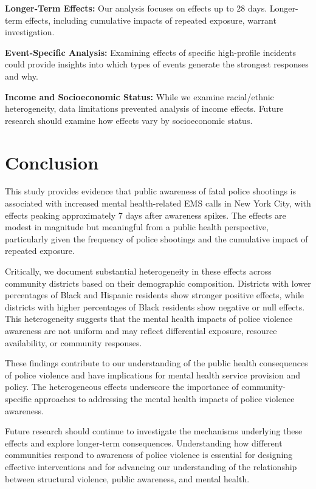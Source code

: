 \documentclass[11pt,a4paper]{article}
\begin{document}
\textbf{Longer-Term Effects:} Our analysis focuses on effects up to 28 days. Longer-term effects, including cumulative impacts of repeated exposure, warrant investigation.

\textbf{Event-Specific Analysis:} Examining effects of specific high-profile incidents could provide insights into which types of events generate the strongest responses and why.

\textbf{Income and Socioeconomic Status:} While we examine racial/ethnic heterogeneity, data limitations prevented analysis of income effects. Future research should examine how effects vary by socioeconomic status.

\section{Conclusion}

This study provides evidence that public awareness of fatal police shootings is associated with increased mental health-related EMS calls in New York City, with effects peaking approximately 7 days after awareness spikes. The effects are modest in magnitude but meaningful from a public health perspective, particularly given the frequency of police shootings and the cumulative impact of repeated exposure.

Critically, we document substantial heterogeneity in these effects across community districts based on their demographic composition. Districts with lower percentages of Black and Hispanic residents show stronger positive effects, while districts with higher percentages of Black residents show negative or null effects. This heterogeneity suggests that the mental health impacts of police violence awareness are not uniform and may reflect differential exposure, resource availability, or community responses.

These findings contribute to our understanding of the public health consequences of police violence and have implications for mental health service provision and policy. The heterogeneous effects underscore the importance of community-specific approaches to addressing the mental health impacts of police violence awareness.

Future research should continue to investigate the mechanisms underlying these effects and explore longer-term consequences. Understanding how different communities respond to awareness of police violence is essential for designing effective interventions and for advancing our understanding of the relationship between structural violence, public awareness, and mental health.
\end{document}
